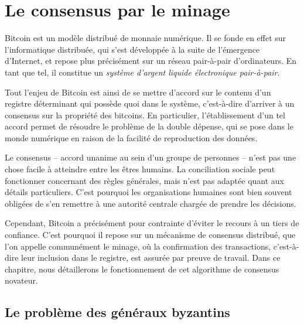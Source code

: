 
\chapter{Le consensus par le minage}
\label{ch:confirmation}

Bitcoin est un modèle distribué de monnaie numérique. Il se fonde en effet sur l'informatique distribuée, qui s'est développée à la suite de l'émergence d'Internet, et repose plus précisément sur un réseau pair-à-pair d'ordinateurs. En tant que tel, il constitue un \emph{système d'argent liquide électronique pair-à-pair}.

Tout l'enjeu de Bitcoin est ainsi de se mettre d'accord sur le contenu d'un registre déterminant qui possède quoi dans le système, c'est-à-dire d'arriver à un consensus sur la propriété des bitcoins. En particulier, l'établissement d'un tel accord permet de résoudre le problème de la double dépense, qui se pose dans le monde numérique en raison de la facilité de reproduction des données.

Le consensus -- accord unanime au sein d'un groupe de personnes -- n'est pas une chose facile à atteindre entre les êtres humains. La conciliation sociale peut fonctionner concernant des règles générales, mais n'est pas adaptée quant aux détails particuliers. C'est pourquoi les organisations humaines sont bien souvent obligées de s'en remettre à une autorité centrale chargée de prendre les décisions.

Cependant, Bitcoin a précisément pour contrainte d'éviter le recours à un tiers de confiance. C'est pourquoi il repose sur un mécanisme de consensus distribué, que l'on appelle communément le minage, où la confirmation des transactions, c'est-à-dire leur inclusion dans le registre, est assurée par preuve de travail. Dans ce chapitre, nous détaillerons le fonctionnement de cet algorithme de consensus novateur.


\section*{Le problème des généraux byzantins} %

